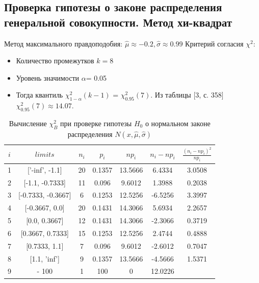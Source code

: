 \documentclass[../main.tex]{subfiles}
\begin{document}
		
    \subsection{Проверка гипотезы о законе распределения генеральной совокупности. Метод хи-квадрат}
    
    \noindent Метод максимального правдоподобия:
    \newline
    $\hat{\mu} \approx -0.2, \hat{\sigma} \approx 0.99$
    \newline Критерий согласия $\chi^{2}$:
    \begin{itemize}
        \item Количество промежутков $k = 8$
        \item Уровень значимости $\alpha$= 0.05
        \item Тогда квантиль $\chi^{2}_{1-\alpha}(k-1)$ = $\chi^{2}_{0.95}(7)$. Из таблицы [3, с. 358] $\chi^{2}_{0.95}(7) \approx 14.07$.
    \end{itemize}

    \newline
 
    \begin{table}[H]
    	\centering
    	\begin{tabular}{| c | c | c | c | c | c | c |}
    		\hline
    		$i$ & $limits$         &   $n_i$ &    $p_i$ &   $np_i$ &   $n_i - np_i$ &   $\frac{(n_i-np_i)^2}{np_i}$ \\
            \hline
                1 & ['-inf', -1.1]      &  20 & 0.1357 &  13.5666 &  6.4334 &  3.0508 \\
                2 & [-1.1, -0.7333]    &  11 & 0.096  &   9.6012 &  1.3988 &  0.2038 \\
                3 & [-0.7333, -0.3667] &  6 & 0.1253 &  12.5256 & -6.5256 &  3.3997 \\
                4 & [-0.3667, 0.0]     & 20 & 0.1431 &  14.3066 &  5.6934 &  2.2657 \\
                5 & [0.0, 0.3667]      & 12 & 0.1431 & 14.3066 & -2.3066 &  0.3719 \\
                6 & [0.3667, 0.7333]   &  15 & 0.1253 & 12.5256 &  2.4744 &  0.4888 \\
                7 & [0.7333, 1.1]      &   7 & 0.096 & 9.6012 & -2.6012 &  0.7047 \\
                8 & [1.1, 'inf']       &  9 & 0.1357 & 13.5666 & -4.5666 &  1.5371 \\
                9 & -                  100 & 1 & 100 & 0 & 12.0226  \\
            \hline
    	\end{tabular}
    	\caption{ Вычисление $\chi^{2}_{B}$ при проверке гипотезы $H_{0}$ о нормальном законе распределения $N(x,\hat{\mu}, \hat{\sigma})$}
    	\label{tab:normal_chi_2}
    \end{table} 
    
\end{document}
